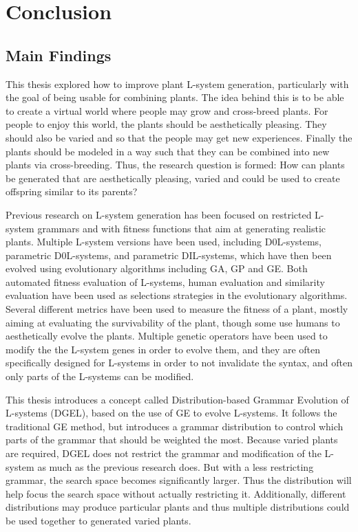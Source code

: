 \chapter{Conclusion}

\section{Main Findings}
This thesis explored how to improve plant L-system generation, particularly with the goal of being usable for combining plants.
The idea behind this is to be able to create a virtual world where people may grow and cross-breed plants.
For people to enjoy this world, the plants should be aesthetically pleasing.
They should also be varied and so that the people may get new experiences.
Finally the plants should be modeled in a way such that they can be combined into new plants via cross-breeding.
Thus, the research question is formed: How can plants be generated that are aesthetically pleasing, varied and could
be used to create offspring similar to its parents?

Previous research on L-system generation has been focused on restricted L-system grammars and with fitness functions that aim at generating realistic plants.
Multiple L-system versions have been used, including D0L-systems, parametric D0L-systems, and parametric DIL-systems, which have then been evolved using evolutionary algorithms including GA, GP and GE.
Both automated fitness evaluation of L-systems, human evaluation and similarity evaluation have been used as selections strategies in the evolutionary algorithms.
Several different metrics have been used to measure the fitness of a plant, mostly aiming at evaluating the survivability of the plant, though some use humans to aesthetically evolve the plants.
Multiple genetic operators have been used to modify the the L-system genes in order to evolve them, and they are often specifically designed for L-systems in order to not invalidate the syntax, and often only parts of the L-systems can be modified.

This thesis introduces a concept called Distribution-based Grammar Evolution of L-systems (DGEL), based on the use of GE to evolve L-systems. %
It follows the traditional GE method, %
but introduces a grammar distribution to control which parts of the grammar that should be weighted the most.
Because varied plants are required, DGEL does not restrict the grammar and modification of the L-system as much as the previous research does.
But with a less restricting grammar, the search space becomes significantly larger.
Thus the distribution will help focus the search space without actually restricting it.
Additionally, different distributions may produce particular plants and thus multiple distributions could be used together to generated varied plants.

